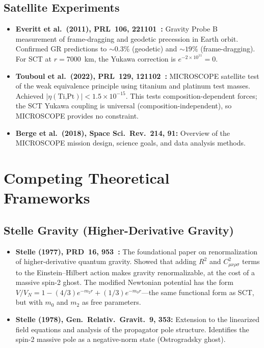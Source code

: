 \documentclass[11pt,a4paper]{article}
\begin{document}
\subsection{Satellite Experiments}

\begin{itemize}[leftmargin=2em]
  \item \textbf{Everitt et al.\ (2011), PRL~106, 221101~\cite{everitt2011}:}
    Gravity Probe B measurement of frame-dragging and geodetic precession
    in Earth orbit. Confirmed GR predictions to $\sim 0.3\%$ (geodetic)
    and $\sim 19\%$ (frame-dragging). For SCT at $r = 7000$~km,
    the Yukawa correction is $e^{-2 \times 10^{11}} = 0$.

  \item \textbf{Touboul et al.\ (2022), PRL~129, 121102~\cite{touboul2022}:}
    MICROSCOPE satellite test of the weak equivalence principle using
    titanium and platinum test masses. Achieved
    $|\eta(\text{Ti,Pt})| < 1.5 \times 10^{-15}$. This tests
    composition-dependent forces; the SCT Yukawa coupling is universal
    (composition-independent), so MICROSCOPE provides no constraint.

  \item \textbf{Berge et al.\ (2018), Space Sci.\ Rev.~214, 91:}
    Overview of the MICROSCOPE mission design, science goals, and
    data analysis methods.
\end{itemize}

\section{Competing Theoretical Frameworks}
\label{sec:theories}

\subsection{Stelle Gravity (Higher-Derivative Gravity)}

\begin{itemize}[leftmargin=2em]
  \item \textbf{Stelle (1977), PRD~16, 953~\cite{stelle1977}:}
    The foundational paper on renormalization of higher-derivative quantum
    gravity. Showed that adding $R^2$ and $C_{\mu\nu\rho\sigma}^2$ terms
    to the Einstein--Hilbert action makes gravity renormalizable, at the cost
    of a massive spin-2 ghost. The modified Newtonian potential has the form
    $V/V_N = 1 - (4/3)e^{-m_2 r} + (1/3)e^{-m_0 r}$---the same functional
    form as SCT, but with $m_0$ and $m_2$ as free parameters.

  \item \textbf{Stelle (1978), Gen.\ Relativ.\ Gravit.~9, 353:}
    Extension to the linearized field equations and analysis of the
    propagator pole structure. Identifies the spin-2 massive pole as a
    negative-norm state (Ostrogradsky ghost).
\end{itemize}
\end{document}

